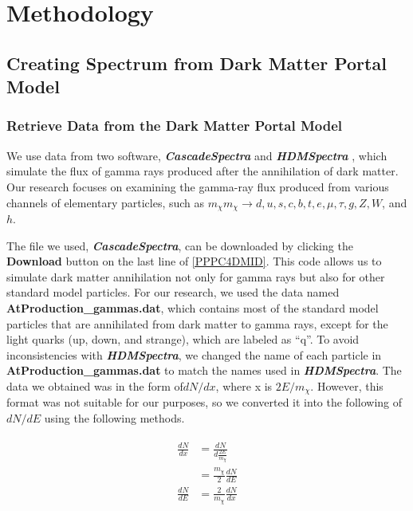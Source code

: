 \documentclass[10pt, oneside]{book}
\numberwithin{equation}{chapter}
\begin{document}
\chapter{Methodology}
\section{Creating Spectrum from Dark Matter Portal Model}
\subsection{Retrieve Data from the Dark Matter Portal Model}
We use data from two software, \textbf{\textit{CascadeSpectra}}  \cite{Marco_Cirelli_2011} and \textbf{\textit{HDMSpectra}} \cite{Bauer_2021}, which simulate the flux of gamma rays produced after the annihilation of dark matter. Our research focuses on examining the gamma-ray flux produced from various channels of elementary particles, such as $m_\chi m_\chi \rightarrow d, u, s, c, b, t, e, \mu, \tau,  g, Z, W$, and $h$.

The file we used, \textbf{\textit{CascadeSpectra}}, can be downloaded by clicking the \textbf{Download} button on the last line of \autoref{PPPC4DMID}. This code allows us to simulate dark matter annihilation not only for gamma rays but also for other standard model particles. For our research, we used the data named \textbf{AtProduction\_gammas.dat}, which contains most of the standard model particles that are annihilated from dark matter to gamma rays, except for the light quarks (up, down, and strange), which are labeled as ``q''. To avoid inconsistencies with \textbf{\textit{HDMSpectra}}, we changed the name of each particle in \textbf{ AtProduction\_gammas.dat} to match the names used in \textbf{\textit{HDMSpectra}}. The data we obtained was in the form of$dN/dx$, where x is $2E/m_\chi$. However, this format was not suitable for our purposes, so we converted it into the following of $dN/dE$ using the following methods.

\begin{eqnarray}
\begin{aligned}
	\frac{dN}{dx} &= \frac{dN}{d\frac{2E}{m_\chi}} \\
	&= \frac{m_\chi}{2} \frac{dN}{dE} \\
	\frac{dN}{dE} &= \frac{2}{m_\chi} \frac{dN}{dx}
 \label{factor}
 \end{aligned}
\end{eqnarray}
\end{document}
